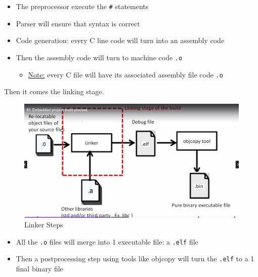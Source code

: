 \begin{itemize}
    \item The preprocessor execute the \verb|#| statements
    
    \item Parser will ensure that syntax is correct
    
    \item Code generation: every C line code will turn into an assembly code
    
    \item Then the assembly code will turn to machine code \verb|.o|
    
    \begin{itemize}
        \item \underline{Note:} every C file will have its associated assembly file code \verb|.o|
    \end{itemize}
    
\end{itemize}

\newpage
Then it comes the linking stage.

\begin{figure}[h]
\centering
\includegraphics[scale=0.5]{Figures/Embedded_C/build_linker_steps}
\caption{Linker Steps}
\label{fig:Embedded_C:build_linker_steps}
\end{figure} 

\begin{itemize}
    \item All the \verb|.o| files will merge into 1 executable file: a \verb|.elf| file
    
    \item Then a postprocessing step using tools like objcopy will turn the \verb|.elf| to a 1 final binary file 
\end{itemize}

\newpage

